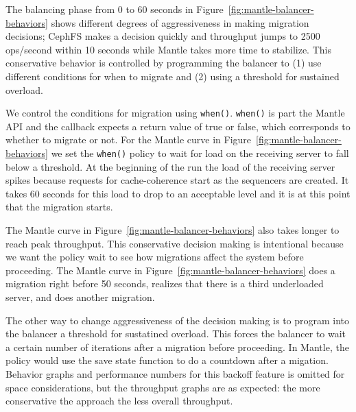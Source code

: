 \documentclass[preprint]{sigplanconf-eurosys}
\begin{document}
The balancing phase from 0 to 60 seconds in
Figure~\ref{fig:mantle-balancer-behaviors} shows different degrees of
aggressiveness in making migration decisions; CephFS makes a decision quickly
and throughput jumps to 2500 ops/second within 10 seconds while Mantle takes
more time to stabilize. This conservative behavior is controlled by programming
the balancer to (1) use different conditions for when to migrate and (2) using
a threshold for sustained overload. 

We control the conditions for migration using \texttt{when()}. \texttt{when()}
is part the Mantle API and the callback expects a return value of true or
false, which corresponds to whether to migrate or not. For the Mantle curve in
Figure~\ref{fig:mantle-balancer-behaviors} we set the \texttt{when()} policy to
wait for load on the receiving server to fall below a threshold. At the
beginning of the run the load of the receiving server spikes because requests
for cache-coherence start as the sequencers are created. It takes 60 seconds
for this load to drop to an acceptable level and it is at this point that the
migration starts. 

The Mantle curve in Figure~\ref{fig:mantle-balancer-behaviors} also takes longer
to reach peak throughput.  This conservative decision making is intentional
because we want the policy wait to see how migrations affect the system before
proceeding. The Mantle curve in Figure~\ref{fig:mantle-balancer-behaviors} does
a migration right before 50 seconds, realizes that there is a third underloaded
server, and does another migration. 

The other way to change aggressiveness of the decision making is to program
into the balancer a threshold for sustatined overload. This forces the balancer
to wait a certain number of iterations after a migration before proceeding. In
Mantle, the policy would use the save state function to do a countdown after a
migation.  Behavior graphs and performance numbers for this backoff feature is
omitted for space considerations, but the throughput graphs are as expected:
the more conservative the approach the less overall throughput.\\
 
\end{document}
